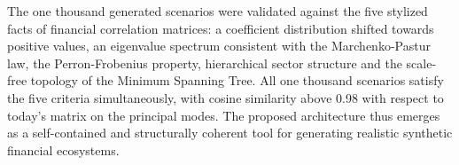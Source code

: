 The one thousand generated scenarios were validated against the five stylized facts of financial correlation matrices: a coefficient distribution shifted towards positive values, an eigenvalue spectrum consistent with the Marchenko-Pastur law, the Perron-Frobenius property, hierarchical sector structure and the scale-free topology of the Minimum Spanning Tree. All one thousand scenarios satisfy the five criteria simultaneously, with cosine similarity above 0.98 with respect to today's matrix on the principal modes. The proposed architecture thus emerges as a self-contained and structurally coherent tool for generating realistic synthetic financial ecosystems.
